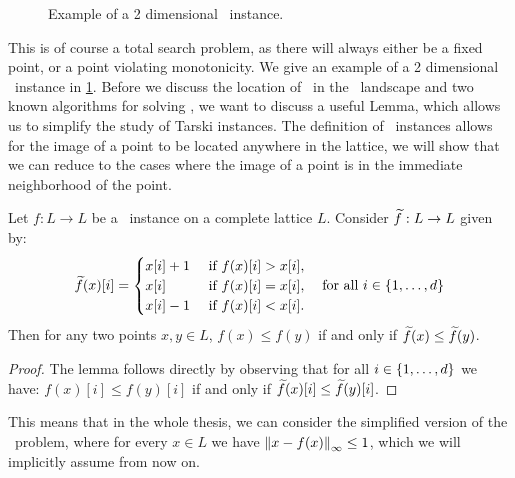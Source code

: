 \begin{figure}
    \centering
    \caption[Example of a \Tarski\ instance]{Example of a 2 dimensional \Tarski\ instance.}
    \label{fig:tarski_example}
\end{figure}

This is of course a total search problem, as there will always either be a fixed point, or a point violating monotonicity. We give an example of a 2 dimensional \Tarski\ instance in \cref{fig:tarski_example}. Before we discuss the location of \Tarski\ in the \TFNP\ landscape and two known algorithms for solving \Tarski, we want to discuss a useful Lemma, which allows us to simplify the study of Tarski instances. The definition of \Tarski\ instances allows for the image of a point to be located anywhere in the lattice, we will show that we can reduce to the cases where the image of a point is in the immediate neighborhood of the point.

\begin{lemma}
    Let $f : L \rightarrow L$ be a \Tarski\ instance on a complete lattice $L$. Consider $\widetilde{f} : L \rightarrow L$ given by: 
    \begin{align*}
        \widetilde{f}(x)[i] = \begin{cases}
                            x[i] + 1 & \text{ if } f(x)[i] > x[i], \\
                            x[i]     & \text{ if } f(x)[i] = x[i], \\
                            x[i] - 1 & \text{ if } f(x)[i] < x[i].
                        \end{cases} \quad \text{for all $i \in \left\{1, \dots, d\right\}$}
    \end{align*}
    Then for any two points $x, y \in L$, $f(x) \leq f(y)$ if and only if $\widetilde{f}(x) \leq \widetilde{f}(y)$.
\end{lemma}
\begin{proof}
    The lemma follows directly by observing that for all $i \in \left\{1, \dots, d\right\}$ we have: $f(x)[i] \leq f(y)[i]$ if and only if $\widetilde{f}(x)[i] \leq \widetilde{f}(y)[i]$.
\end{proof}
This means that in the whole thesis, we can consider the simplified version of the \Tarski\ problem, where for every $x \in L$ we have $\left\lVert x - f(x)\right\rVert_{\infty} \leq 1$, which we will implicitly assume from now on.

